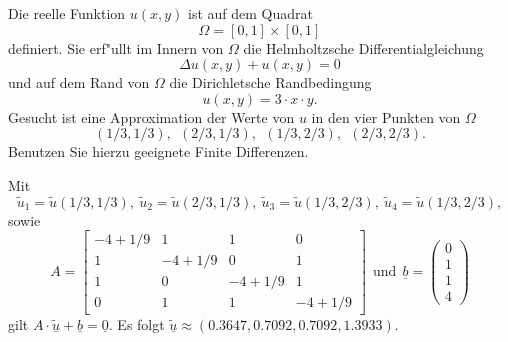 Die reelle Funktion $u(x,y)$ ist auf dem Quadrat
\[
\Omega = [0, 1] \times [0,1]
\]
definiert.
Sie erf"ullt im Innern von $\Omega$ die Helmholtzsche Differentialgleichung
\[
\Delta u(x,y) + u(x,y) = 0
\]
und auf dem Rand von $\Omega$ die Dirichletsche Randbedingung
\[
u(x,y) = 3 \cdot x \cdot y.
\]
Gesucht ist eine Approximation der Werte von $u$ in den vier Punkten
von $\Omega$
\[
(1/3,1/3), \ \  (2/3,1/3), \ \ (1/3,2/3), \ \ (2/3, 2/3).
\]
Benutzen Sie hierzu geeignete Finite Differenzen.

\begin{loesung}
Mit 
\[
\tilde u_1 = \tilde u(1/3,1/3), \ \tilde u_2 = \tilde u(2/3,1/3), \ \tilde u_3 = \tilde u(1/3,2/3), \ \tilde u_4 = \tilde u(1/3,2/3),
\]
sowie
\[
A = \left[\begin{array}{cccc} 
-4 + 1/9 & 1  & 1 & 0 \\
 1 & -4 + 1/9 & 0 & 1 \\
 1 & 0 & -4 + 1/9 & 1 \\ 
 0 & 1 & 1  & -4 + 1/9 \end{array}\right]
\ \ \text{und} \ \
\underline{b} =  \left(\begin{array}{r} 0 \\ 1 \\ 1 \\ 4 \end{array}\right)
\]
gilt
$A \cdot \underline{\tilde u} + \underline{b} = \underline{0}.$
Es folgt
$\underline{\tilde u} \approx (0.3647, 0.7092, 0.7092, 1.3933).$
\end{loesung}

